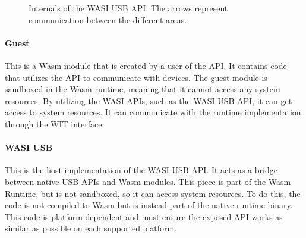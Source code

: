 \begin{figure}[!h]
\centering
{}
\caption{Internals of the \acrshort{WASI} \acrshort{USB} \acrshort{API}. The arrows represent communication between the different areas.}
\label{image:api_areas}
\end{figure}

\paragraph{Guest} This is a \acrshort{Wasm} module that is created by a user of the \acrshort{API}. It contains code that utilizes the API to communicate with devices. The guest module is sandboxed in the \acrshort{Wasm} runtime, meaning that it cannot access any system resources. By utilizing the WASI APIs, such as the \acrshort{WASI} \acrshort{USB} \acrshort{API}, it can get access to system resources. It can communicate with the runtime implementation through the \acrshort{WIT} interface.

\paragraph{WASI USB} This is the host implementation of the \acrshort{WASI} \acrshort{USB} \acrshort{API}. It acts as a bridge between native \acrshort{USB} \acrshort{API}s and \acrshort{Wasm} modules. This piece is part of the \acrshort{Wasm} Runtime, but is not sandboxed, so it can access system resources. To do this, the code is not compiled to \acrshort{Wasm} but is instead part of the native runtime binary. This code is platform-dependent and must ensure the exposed \acrshort{API} works as similar as possible on each supported platform.

